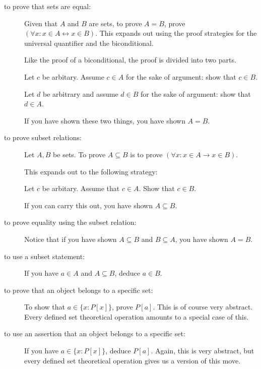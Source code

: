 \documentclass[12pt]{book}
\begin{document}
\begin{description}

\item[to prove that sets are equal:]

Given that $A$ and $B$ are sets, to prove $A=B$, prove $(\forall x:x \in A \leftrightarrow x \in B)$.  This expands out using the proof strategies for the universal quantifier and the biconditional. 

Like the proof of a biconditional,  the proof is divided into two parts.

Let $c$ be arbitary.  Assume $c \in A$ for the sake of argument:  show that $c \in B$.

Let $d$ be arbitrary and assume $d \in B$ for the sake of argument:  show that $d \in A$.

If you have shown these two things, you have shown $A=B$.

\item[to prove subset relations:]

Let $A,B$ be sets.  To prove $A \subseteq B$ is to prove $(\forall x:x \in A \rightarrow x\in B)$.

This expands out to the following strategy:

Let $c$ be arbitary.  Assume that $c \in A$.  Show that $c \in B$.

If you can carry this out, you have shown $A \subseteq B$.

\item[to prove equality using the subset relation:]

Notice that if you have shown $A \subseteq B$ and $B \subseteq A$, you have shown $A=B$.

\item[to use a subset statement:]  If you have $a \in A$ and $A \subseteq B$, deduce $a \in B$.

\item[to prove that an object belongs to a specific set:]

To show that $a \in \{x:P[x]\}$, prove $P[a]$.  This is of course very abstract.  Every defined set theoretical operation amounts to a special case of this.

\item[to use an assertion that an object belongs to a specific set:]

If you have $a \in \{x:P[x]\}$, deduce $P[a]$.  Again, this is very abstract, but every defined set theoretical operation gives us a version of this move.


\end{description}
\end{document}
